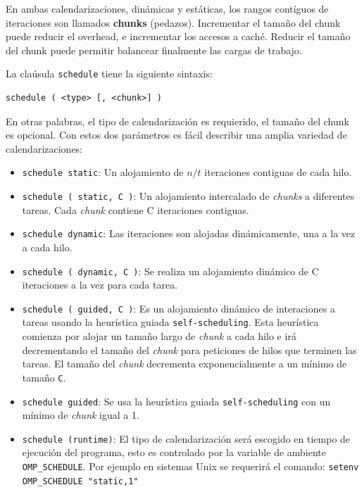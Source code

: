 \documentclass[12pt,letterpaper]{book}
\begin{document}
En ambas calendarizaciones, dinámicas y estáticas, los rangos contíguos de iteraciones son llamados \textbf{chunks} (pedazos). Incrementar el tamaño del chunk puede reducir el overhead, e incrementar los accesos a caché. Reducir el tamaño del chunk puede permitir balancear finalmente las cargas de trabajo.

La claúsula \texttt{schedule} tiene la siguiente sintaxis:

\begin{lstlisting}[style=C]
schedule ( <type> [, <chunk>] )
\end{lstlisting}

En otras palabras, el tipo de calendarización es requierido, el tamaño del chunk es opcional. Con estos dos parámetros es fácil describir una amplia variedad de calendarizaciones:

\begin{itemize}

\item \texttt{schedule static}: Un alojamiento de $n/t$ iteraciones contiguas de cada hilo.

\item \texttt{schedule ( static, C )}: Un alojamiento intercalado de \textit{chunks} a diferentes tareas. Cada \textit{chunk} contiene C iteraciones contiguas.

\item \texttt{schedule dynamic}: Las iteraciones son alojadas dinámicamente, una a la vez a cada hilo.

\item \texttt{schedule ( dynamic, C )}: Se realiza un alojamiento dinámico de C iteraciones a la vez para cada tarea.

\item \texttt{schedule ( guided, C )}: Es un alojamiento dinámico de interaciones a tareas usando la heurística guiada \texttt{self-scheduling}. Esta heurística comienza por alojar un tamaño largo de \textit{chunk} a cada hilo e irá decrementando el tamaño del \textit{chunk} para peticiones de hilos que terminen las tareas. El tamaño del \textit{chunk} decrementa exponencialmente a un mínimo de tamaño \texttt{C}.

\item \texttt{schedule guided}: Se usa la heurística guiada \texttt{self-scheduling} con un mínimo de \textit{chunk} igual a 1.

\item \texttt{schedule (runtime)}: El tipo de calendarización será escogido en tiempo de ejecución del programa, esto es controlado por la variable de ambiente \texttt{OMP\_SCHEDULE}. Por ejemplo en sistemas Unix se requerirá el comando:
\texttt{setenv OMP\_SCHEDULE "static,1"}

\end{itemize}
\end{document}
